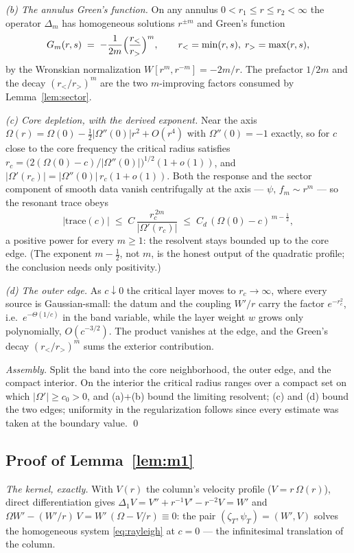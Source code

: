 \documentclass[11pt,letterpaper]{amsart}
\theoremstyle{definition}
\theoremstyle{remark}
\newcommand{\abs}[1]{\lvert #1 \rvert}
\begin{document}
\emph{(b) The annulus Green's function.} On any annulus
$0<r_1\le r\le r_2<\infty$ the operator $\Delta_m$ has homogeneous solutions
$r^{\pm m}$ and Green's function
\[
G_m(r,s)\;=\;-\frac{1}{2m}\Bigl(\frac{r_<}{r_>}\Bigr)^{m},
\qquad r_<=\min(r,s),\; r_>=\max(r,s),
\]
by the Wronskian normalization $W[r^m,r^{-m}]=-2m/r$. The prefactor $1/2m$ and the
decay $(r_</r_>)^m$ are the two $m$-improving factors consumed by
Lemma~\ref{lem:sector}.

\emph{(c) Core depletion, with the derived exponent.} Near the axis
$\Omega(r)=\Omega(0)-\tfrac12\abs{\Omega''(0)}r^2+O(r^4)$ with $\Omega''(0)=-1$
exactly, so for $c$ close to the core frequency the critical radius satisfies
$r_c=\bigl(2(\Omega(0)-c)/\abs{\Omega''(0)}\bigr)^{1/2}(1+o(1))$, and
$\abs{\Omega'(r_c)}=\abs{\Omega''(0)}\,r_c(1+o(1))$. Both the response and the sector
component of smooth data vanish centrifugally at the axis --- $\psi,\,f_m\sim r^m$ ---
so the resonant trace obeys
\[
\abs{\mathrm{trace}(c)}\;\le\;C\,\frac{r_c^{\,2m}}{\abs{\Omega'(r_c)}}
\;\le\;C_d\,(\Omega(0)-c)^{\,m-\frac12},
\]
a positive power for every $m\ge1$: the resolvent stays bounded up to the core edge.
(The exponent $m-\tfrac12$, not $m$, is the honest output of the quadratic profile;
the conclusion needs only positivity.)

\emph{(d) The outer edge.} As $c\downarrow0$ the critical layer moves to
$r_c\to\infty$, where every source is Gaussian-small: the datum and the coupling
$W'/r$ carry the factor $e^{-r_c^2}$, i.e.\ $e^{-\Theta(1/c)}$ in the band variable,
while the layer weight $w$ grows only polynomially, $O(c^{-3/2})$. The product
vanishes at the edge, and the Green's decay $(r_</r_>)^m$ sums the exterior
contribution.

\emph{Assembly.} Split the band into the core neighborhood, the outer edge, and the
compact interior. On the interior the critical radius ranges over a compact set on
which $\abs{\Omega'}\ge c_0>0$, and (a)+(b) bound the limiting resolvent; (c) and (d)
bound the two edges; uniformity in the regularization follows since every estimate was
taken at the boundary value. \qed

\subsection{Proof of Lemma~\ref{lem:m1}}\label{pf:m1}
\emph{The kernel, exactly.} With $V(r)$ the column's velocity profile
($V=r\,\Omega(r)$), direct differentiation gives
$\Delta_1V=V''+r^{-1}V'-r^{-2}V=W'$ and
$\Omega W'-(W'/r)\,V=\allowbreak W'\,(\Omega-V/r)\equiv0$:
the pair $(\zeta_T,\psi_T)=(W',V)$ solves the homogeneous system \eqref{eq:rayleigh}
at $c=0$ --- the infinitesimal translation of the column.
\end{document}
